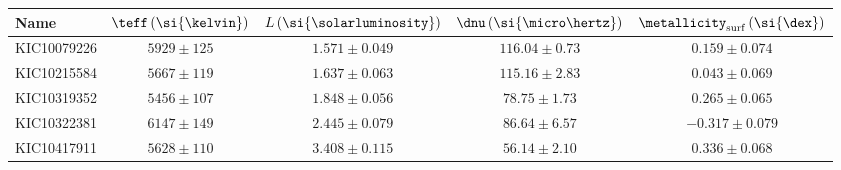 \begin{tabular}{lcccc}
\toprule
Name & $\teff\,(\si{\kelvin})$ & $L\,(\si{\solarluminosity})$ & $\dnu\,(\si{\micro\hertz})$ & $\metallicity_\mathrm{surf}\,(\si{\dex})$ \\
\midrule
  KIC10079226 &            $5929\pm125$ &              $1.571\pm0.049$ &             $116.04\pm0.73$ &                           $0.159\pm0.074$ \\
  KIC10215584 &            $5667\pm119$ &              $1.637\pm0.063$ &             $115.16\pm2.83$ &                           $0.043\pm0.069$ \\
  KIC10319352 &            $5456\pm107$ &              $1.848\pm0.056$ &              $78.75\pm1.73$ &                           $0.265\pm0.065$ \\
  KIC10322381 &            $6147\pm149$ &              $2.445\pm0.079$ &              $86.64\pm6.57$ &                          $-0.317\pm0.079$ \\
  KIC10417911 &            $5628\pm110$ &              $3.408\pm0.115$ &              $56.14\pm2.10$ &                           $0.336\pm0.068$ \\
\bottomrule
\end{tabular}
